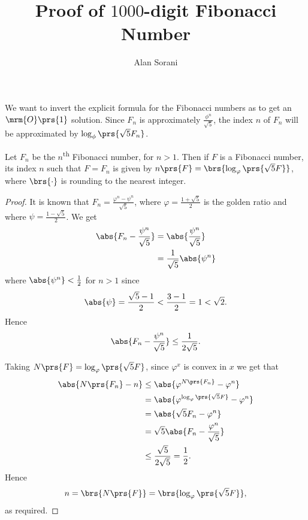 \documentclass[10pt]{article}
\author{Alan Sorani}
\title{Proof of $1000$-digit Fibonacci Number}
\begin{document}
\maketitle

We want to invert the explicit formula for the Fibonacci numbers as to get an $\mrm{O}\prs{1}$ solution.
Since
$F_n$ is approximately $\frac{\phi^n}{\sqrt{5}}$, the index $n$ of $F_n$ will be approximated by $\log_\phi\prs{\sqrt{5} F_n}$.

\begin{theorem}
Let $F_n$ be the $n$\textsuperscript{th} Fibonacci number, for $n > 1$. Then if $F$ is a Fibonacci number, its index $n$ such that $F = F_n$ is given by $n\prs{F} = \brs{\log_\varphi\prs{\sqrt{5}F}}$, where $\brs{\cdot}$ is rounding to the nearest integer.
\end{theorem}

\begin{proof}
It is known that $F_n = \frac{\varphi^n - \psi^n}{\sqrt{5}}$, where $\varphi = \frac{1 + \sqrt{5}}{2}$ is the golden ratio and where $\psi = \frac{1 - \sqrt{5}}{2}$.
We get
\begin{align*}
\abs{F_n - \frac{\psi^n}{\sqrt{5}}} &= \abs{\frac{\psi^n}{\sqrt{5}}}
\\&= \frac{1}{\sqrt{5}} \abs{\psi^n}
\end{align*}
where $\abs{\psi^n} < \frac{1}{2}$ for $n > 1$ since
\begin{align*}
\abs{\psi} = \frac{\sqrt{5} - 1}{2} < \frac{3-1}{2} = 1 < \sqrt{2} \text{.}
\end{align*}
Hence
\begin{align*}
\abs{F_n - \frac{\psi^n}{\sqrt{5}}} \leq \frac{1}{2 \sqrt{5}} \text{.}
\end{align*}

Taking $N\prs{F} = \log_\varphi\prs{\sqrt{5} F}$, since $\varphi^x$ is convex in $x$ we get that
\begin{align*}
\abs{N\prs{F_n} - n} &\leq \abs{\varphi^{N\prs{F_n}} - \varphi^n}
\\&=
\abs{\varphi^{\log_{\varphi}\prs{\sqrt{5}F}} - \varphi^n}
\\&= \abs{\sqrt{5}F_n - \varphi^n}
\\&= \sqrt{5} \abs{F_n - \frac{\varphi^n}{\sqrt{5}}}
\\&\leq \frac{\sqrt{5}}{2 \sqrt{5}} = \frac{1}{2} \text{.}
\end{align*}
Hence
\begin{align*}
n = \brs{N\prs{F}} = \brs{\log_{\varphi}\prs{\sqrt{5}F}} \text{,}
\end{align*}
as required.
\end{proof}
\end{document}
